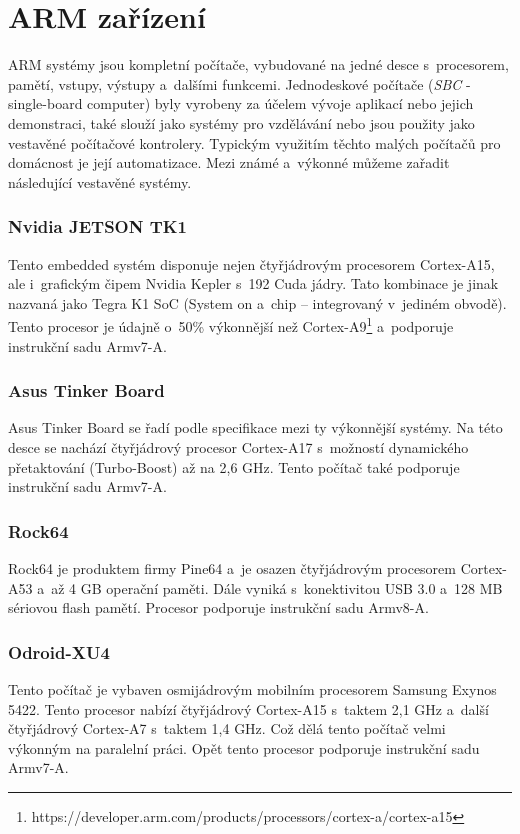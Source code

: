 \section{ARM zařízení}
ARM systémy jsou kompletní počítače, vybudované na jedné desce s~procesorem, pamětí, vstupy, výstupy a~dalšími funkcemi. Jednodeskové počítače (\textit{SBC} - single-board computer) byly vyrobeny za účelem vývoje aplikací nebo jejich demonstraci, také slouží jako systémy pro vzdělávání nebo jsou použity jako vestavěné počítačové kontrolery. Typickým využitím těchto malých počítačů pro domácnost je její automatizace. 
Mezi známé a~výkonné můžeme zařadit následující vestavěné systémy.

\subsubsection*{Nvidia JETSON TK1}
Tento embedded systém disponuje nejen čtyřjádrovým procesorem Cortex-A15, ale i~grafickým čipem Nvidia Kepler s~192 Cuda jádry. Tato kombinace je jinak nazvaná jako Tegra K1 SoC (System on a~chip – integrovaný v~jediném obvodě). Tento procesor je údajně o~50\% výkonnější než Cortex-A9\footnote{https://developer.arm.com/products/processors/cortex-a/cortex-a15} a~podporuje instrukční sadu Armv7-A.

\subsubsection*{Asus Tinker Board}
Asus Tinker Board se řadí podle specifikace mezi ty výkonnější systémy. Na této desce se nachází čtyřjádrový procesor Cortex-A17 s~možností dynamického přetaktování (Turbo-Boost) až na 2,6 GHz. Tento počítač také podporuje instrukční sadu Armv7-A.  

\subsubsection*{Rock64}
Rock64 je produktem firmy Pine64 a~je osazen čtyřjádrovým procesorem Cortex-A53 a~až 4 GB operační paměti. Dále vyniká s~konektivitou USB 3.0 a~128 MB sériovou flash pamětí. Procesor podporuje instrukční sadu Armv8-A.

\subsubsection*{Odroid-XU4}
Tento počítač je vybaven osmijádrovým mobilním procesorem Samsung Exynos 5422. Tento procesor nabízí čtyřjádrový Cortex-A15 s~taktem 2,1 GHz a~další čtyřjádrový Cortex-A7 s~taktem 1,4 GHz. Což dělá tento počítač velmi výkonným na paralelní práci. Opět tento procesor podporuje instrukční sadu Armv7-A.


